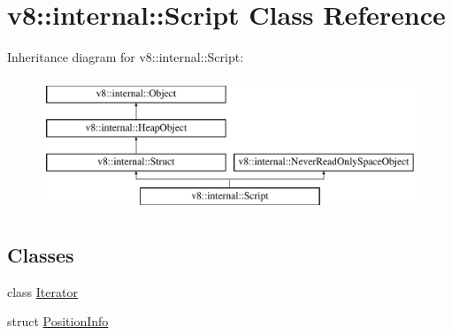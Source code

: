 \hypertarget{classv8_1_1internal_1_1Script}{}\section{v8\+:\+:internal\+:\+:Script Class Reference}
\label{classv8_1_1internal_1_1Script}
Inheritance diagram for v8\+:\+:internal\+:\+:Script\+:\begin{figure}[H]
\begin{center}
\leavevmode
\includegraphics[height=4.000000cm]{classv8_1_1internal_1_1Script}
\end{center}
\end{figure}
\subsection*{Classes}
\begin{DoxyCompactItemize}
\item 
class \mbox{\hyperlink{classv8_1_1internal_1_1Script_1_1Iterator}{Iterator}}
\item 
struct \mbox{\hyperlink{structv8_1_1internal_1_1Script_1_1PositionInfo}{Position\+Info}}
\end{DoxyCompactItemize}
